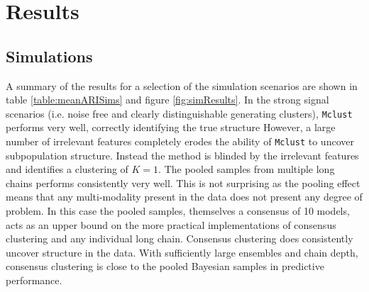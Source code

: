 \documentclass{bioinfo}
\begin{document}
\section{Results}
\subsection{Simulations}
A summary of the results for a selection of the simulation scenarios are shown in table \ref{table:meanARISims} and figure \ref{fig:simResults}. In the strong signal scenarios (i.e. noise free and clearly distinguishable generating clusters), \texttt{Mclust} performs very well, correctly identifying the true structure However, a large number of irrelevant features completely erodes the ability of \texttt{Mclust} to uncover subpopulation structure. Instead the method is blinded by the irrelevant features and identifies a clustering of $K=1$. The pooled samples from multiple long chains performs consistently very well. This is not surprising as the pooling effect means that any multi-modality present in the data does not present any degree of problem. In this case the pooled samples, themselves a consensus of 10 models, acts as an upper bound on the more practical implementations of consensus clustering and any individual long chain. Consensus clustering does consistently uncover structure in the data. With sufficiently large ensembles and chain depth, consensus clustering is close to the pooled Bayesian samples in predictive performance.
\end{document}
